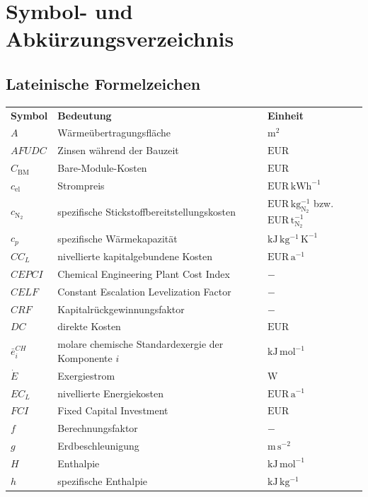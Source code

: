 \chapter*{Symbol- und Abkürzungsverzeichnis}

\section*{Lateinische Formelzeichen}

\begin{longtable}{p{3cm}p{8cm}p{3cm}}
\textbf{Symbol} & \textbf{Bedeutung} & \textbf{Einheit} \\
\addlinespace[0.5em]
$A$ & Wärmeübertragungsfläche & $\mathrm{m^2}$ \\
$AFUDC$ & Zinsen während der Bauzeit & $\mathrm{EUR}$ \\
$C_\mathrm{BM}$ & Bare-Module-Kosten & $\mathrm{EUR}$ \\
$c_\mathrm{el}$ & Strompreis & $\mathrm{EUR\,kWh^{-1}}$ \\
$c_{\mathrm{N_2}}$ & spezifische Stickstoffbereitstellungskosten & $\mathrm{EUR\,kg_{N_2}^{-1}}$ bzw. $\mathrm{EUR\,t_{N_2}^{-1}}$ \\
$c_p$ & spezifische Wärmekapazität & $\mathrm{kJ\,kg^{-1}\,K^{-1}}$ \\
$CC_L$ & nivellierte kapitalgebundene Kosten & $\mathrm{EUR\,a^{-1}}$ \\
$CEPCI$ & Chemical Engineering Plant Cost Index & $-$ \\
$CELF$ & Constant Escalation Levelization Factor & $-$ \\
$CRF$ & Kapitalrückgewinnungsfaktor & $-$ \\
$DC$ & direkte Kosten & $\mathrm{EUR}$ \\
$\bar{e}^{CH}_i$ & molare chemische Standardexergie der Komponente $i$ & $\mathrm{kJ\,mol^{-1}}$ \\
$\dot{E}$ & Exergiestrom & $\mathrm{W}$ \\
$EC_L$ & nivellierte Energiekosten & $\mathrm{EUR\,a^{-1}}$ \\
$FCI$ & Fixed Capital Investment & $\mathrm{EUR}$ \\
$f$ & Berechnungsfaktor & $-$ \\
$g$ & Erdbeschleunigung & $\mathrm{m\,s^{-2}}$ \\
$H$ & Enthalpie & $\mathrm{kJ\,mol^{-1}}$ \\
$h$ & spezifische Enthalpie & $\mathrm{kJ\,kg^{-1}}$ \\

\end{longtable}
